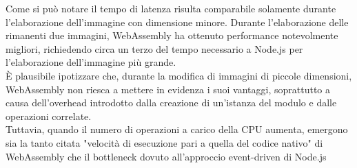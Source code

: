 Come si può notare il tempo di latenza risulta comparabile solamente durante l'elaborazione dell'immagine con dimensione minore. Durante l'elaborazione delle rimanenti due immagini, WebAssembly ha ottenuto performance notevolmente migliori, richiedendo circa un terzo del tempo necessario a Node.js per l'elaborazione dell'immagine più grande.
\\È plausibile ipotizzare che, durante la modifica di immagini di piccole dimensioni, WebAssembly non riesca a mettere in evidenza i suoi vantaggi, soprattutto a causa dell'overhead introdotto dalla creazione di un'istanza del modulo e dalle operazioni correlate.
\\Tuttavia, quando il numero di operazioni a carico della CPU aumenta, emergono sia la tanto citata "velocità di esecuzione pari a quella del codice nativo" di WebAssembly che il bottleneck dovuto all'approccio event-driven di Node.js
